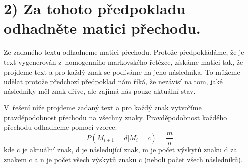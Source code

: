 \documentclass[11pt]{article}
\begin{document}
\section*{2) Za tohoto předpokladu odhadněte matici
přechodu.}\label{za-tohoto-pux159edpokladu-odhadnux11bte-matici-pux159echodu.}

Ze zadaného textu odhadneme matici přechodu. Protože předpokládáme, že je
text vygenerován z~homogenního markovského řetězce, získáme matici tak,
že projdeme text a pro každý znak se podíváme na jeho následníka. To
můžeme udělat protože předchozí předpoklad nám říká, že nezávisí na tom,
jaké následníky měl znak dříve, ale zajímá nás pouze aktuální stav.

V~řešení níže projdeme zadaný text a pro každý znak vytvoříme
pravděpodobnost přechodu na všechny znaky. Pravděpodobnost každého
přechodu odhadneme pomocí vzorce:
\[P(M_{i+1}= d | M_i = c)=\frac{m}{n}\] kde c je aktuální znak, d je
následující znak, m je počet výskytů znaku d za znakem c a n je počet
všech výskytů znaku c (neboli počet všech následníků).
\end{document}
